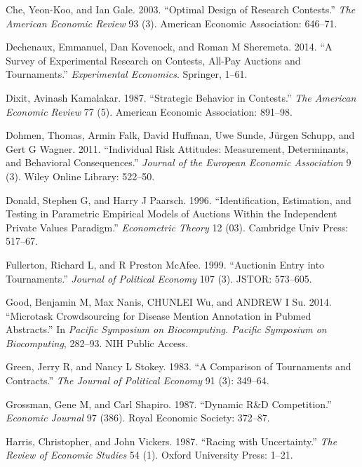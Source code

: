 \documentclass[10pt, titlepage]{article}
\begin{document}
\hypertarget{ref-che2003optimal}{}
Che, Yeon-Koo, and Ian Gale. 2003. ``Optimal Design of Research
Contests.'' \emph{The American Economic Review} 93 (3). American
Economic Association: 646--71.

\hypertarget{ref-dechenaux2014survey}{}
Dechenaux, Emmanuel, Dan Kovenock, and Roman M Sheremeta. 2014. ``A
Survey of Experimental Research on Contests, All-Pay Auctions and
Tournaments.'' \emph{Experimental Economics}. Springer, 1--61.

\hypertarget{ref-dixit1987strategic}{}
Dixit, Avinash Kamalakar. 1987. ``Strategic Behavior in Contests.''
\emph{The American Economic Review} 77 (5). American Economic
Association: 891--98.

\hypertarget{ref-dohmen2011individual}{}
Dohmen, Thomas, Armin Falk, David Huffman, Uwe Sunde, Jürgen Schupp, and
Gert G Wagner. 2011. ``Individual Risk Attitudes: Measurement,
Determinants, and Behavioral Consequences.'' \emph{Journal of the
European Economic Association} 9 (3). Wiley Online Library: 522--50.

\hypertarget{ref-donald1996identification}{}
Donald, Stephen G, and Harry J Paarsch. 1996. ``Identification,
Estimation, and Testing in Parametric Empirical Models of Auctions
Within the Independent Private Values Paradigm.'' \emph{Econometric
Theory} 12 (03). Cambridge Univ Press: 517--67.

\hypertarget{ref-fullerton1999auctionin}{}
Fullerton, Richard L, and R Preston McAfee. 1999. ``Auctionin Entry into
Tournaments.'' \emph{Journal of Political Economy} 107 (3). JSTOR:
573--605.

\hypertarget{ref-good2014microtask}{}
Good, Benjamin M, Max Nanis, CHUNLEI Wu, and ANDREW I Su. 2014.
``Microtask Crowdsourcing for Disease Mention Annotation in Pubmed
Abstracts.'' In \emph{Pacific Symposium on Biocomputing. Pacific
Symposium on Biocomputing}, 282--93. NIH Public Access.

\hypertarget{ref-green1983comparison}{}
Green, Jerry R, and Nancy L Stokey. 1983. ``A Comparison of Tournaments
and Contracts.'' \emph{The Journal of Political Economy} 91 (3):
349--64.

\hypertarget{ref-grossman1987dynamic}{}
Grossman, Gene M, and Carl Shapiro. 1987. ``Dynamic R\&D Competition.''
\emph{Economic Journal} 97 (386). Royal Economic Society: 372--87.

\hypertarget{ref-harris1987racing}{}
Harris, Christopher, and John Vickers. 1987. ``Racing with
Uncertainty.'' \emph{The Review of Economic Studies} 54 (1). Oxford
University Press: 1--21.
\end{document}
